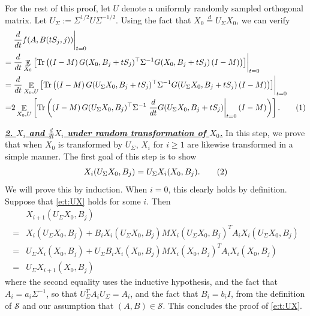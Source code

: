 \documentclass{article}
\DeclareMathOperator{\E}{\mathbb{E}}
\renewcommand{\S}{{\mathcal S}}
\newcommand{\emphh}[1]{\textbf{\emph{#1}}}
\DeclareMathOperator{\tr}{Tr}
\newcommand*\lrb[1]{\left[ #1 \right]}
\newcommand*\lrp[1]{\left( #1 \right)}
\newcommand\numberthis{\addtocounter{equation}{1}\tag{\theequation}}
\newcommand*\at[2]{\left.#1\right|_{#2}}
\newcommand{\US}{U_\Sigma}
\begin{document}
For the rest of this proof, let $U$ denote a uniformly randomly sampled orthogonal matrix. Let $\US:= \Sigma^{1/2} U \Sigma^{-1/2}$. Using the fact that $X_0 \overset{d}{=} \US X_0$, we can verify
\begin{align*}
& \at{\frac{d}{dt} f(A, B(tS_j,j))}{t=0}\\
=& \at{\frac{d}{dt}\E_{X_0} \lrb{\tr\lrp{\lrp{I-M} G(X_0, B_j + t S_j)^\top \Sigma^{-1} G( X_0, B_j + t S_j) \lrp{I-M}}}}{t=0}\\
=& \at{\frac{d}{dt}\E_{X_0, U} \lrb{\tr\lrp{\lrp{I-M} G(\US X_0, B_j + t S_j)^\top \Sigma^{-1} G(\US X_0, B_j + t S_j) \lrp{I-M}}}}{t=0}\\
=& 2\E_{X_0, U} \lrb{\tr\lrp{\lrp{I-M} G(\US X_0, B_j )^\top \Sigma^{-1} \at{\frac{d}{dt} G(\US X_0, B_j + t S_j)}{t=0} \lrp{I-M}}}.
\numberthis \label{e:t:rmlsdm:0}
\end{align*}

\underline{\emphh{2. $X_i$ and $\frac{d}{dt} X_i$ under random transformation of $X_0$.}} In this step, we prove that when $X_0$ is transformed by $\US$, $X_i$ for $i\geq 1$ are likewise transformed in a simple manner. The first goal of this step is to show
\begin{align*}
X_i(\US X_0, B_j) = \US X_i(X_0, B_j).
\numberthis \label{e:t:UX}
\end{align*}
We will prove this by induction. When $i=0$, this clearly holds by definition. Suppose that \eqref{e:t:UX} holds for some $i$. Then
\begin{align*}
& X_{i+1}(\US X_0, B_j)\\
=& X_i(\US X_0, B_j) + B_i X_i(\US X_0, B_j) M X_i(\US X_0, B_j)^T A_i X_i(\US X_0, B_j) \\
=& \US X_i(X_0, B_j) + \US B_i X_i(X_0, B_j) M X_i(X_0, B_j)^T A_i X_i(X_0, B_j)\\
=& \US X_{i+1} (X_0, B_j)
\end{align*}
where the second equality uses the inductive hypothesis, and the fact that $A_i = a_i \Sigma^{-1}$, so that $\US^T A_i \US = A_i$, and the fact that $B_i = b_i I$, from the definition of $\S$ and our assumption that $(A,B)\in \S$. This concludes the proof of \eqref{e:t:UX}.
\end{document}
